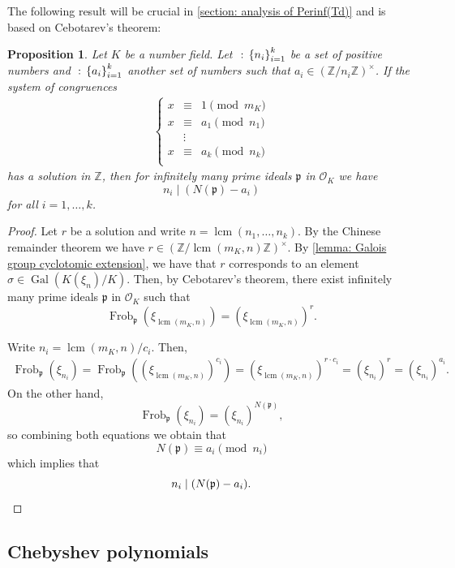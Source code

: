 \documentclass{amsart}
\def\set#1{{\def\st{\;:\;}\left\{#1\right\}}}
\def\ZZ{\mathbb Z}
\def\OK{\mathcal{O}_K}
\DeclareMathOperator{\Gal}{Gal}
\DeclareMathOperator{\st}{st}
\DeclareMathOperator{\lcm}{lcm}
\DeclareMathOperator{\Frob}{Frob}
\newtheorem{proposition}{Proposition}[section]
\theoremstyle{definition}
\begin{document}
The following result will be crucial in \cref{section: analysis of Perinf(Td)} and is based on Cebotarev's theorem:

\begin{proposition}
Let $K$ be a number field. Let $\set{n_i}_{i = 1}^k$ be a set of positive numbers and $\set{a_i}_{i = 1}^k$ another set of numbers such that $a_i \in (\ZZ/n_i\ZZ)^\times$. If the system of congruences 
\begin{align*}
\left \{ \begin{matrix} 
x &\equiv &1 \pmod{m_K} \\
x &\equiv &a_1 \pmod{n_1} \\
& \vdots &\\
x &\equiv &a_k \pmod{n_k} \\
\end{matrix}\right.
\end{align*} 
has a solution in $\ZZ$, then for infinitely many prime ideals $\mathfrak{p}$ in $\OK$ we have $$n_i \mid (N(\mathfrak{p})-a_i)$$ for all $i = 1, \dots, k$.
\label{proposition: cebotarev in my case}
\end{proposition}

\begin{proof}
Let $r$ be a solution and write $n = \lcm(n_1, \dots, n_k)$. By the Chinese remainder theorem we have $r \in (\ZZ/\lcm(m_K,n)\ZZ)^\times$. By \cref{lemma: Galois group cyclotomic extension}, we have that $r$ corresponds to an element $\sigma \in \Gal(K(\xi_n)/K)$. Then, by Cebotarev's theorem, there exist infinitely many prime ideals $\mathfrak{p}$ in $\OK$ such that 
$$\Frob_\mathfrak{p}(\xi_{\lcm(m_K,n)}) = (\xi_{\lcm(m_K,n)})^r.$$ 

Write $n_i = \lcm(m_K,n)/c_i$. Then, 
\begin{align*}
\Frob_\mathfrak{p}(\xi_{n_i}) = \Frob_\mathfrak{p}((\xi_{\lcm(m_K,n)})^{c_i}) = (\xi_{\lcm(m_K,n)})^{r \cdot c_i} = (\xi_{n_i})^r = (\xi_{n_i})^{a_i}.
\end{align*}
On the other hand, $$\Frob_\mathfrak{p}(\xi_{n_i}) = (\xi_{n_i})^{N(\mathfrak{p})},$$ so combining both equations we obtain that $$N(\mathfrak{p}) \equiv a_i \pmod{n_i}$$ which implies that 
\begin{equation*}
n_i \mid (N(\mathfrak{p})-a_i). \qedhere
\end{equation*}
\end{proof}






\subsection{Chebyshev polynomials}
\end{document}
